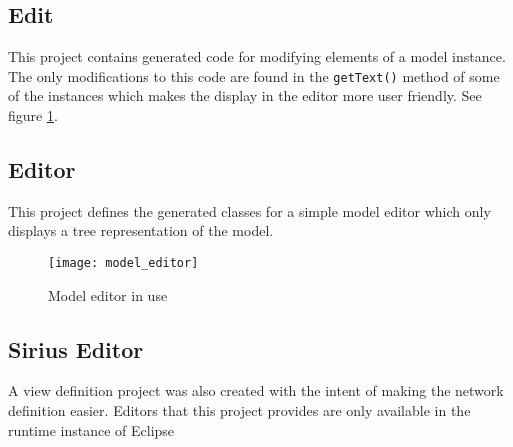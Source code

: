 \subsection{Edit}
This project contains generated code for modifying elements of a model instance. The only
modifications to this code are found in the \texttt{getText()} method of some of the instances
which makes the display in the editor more user friendly. See figure \ref{fig:model_editor}.
\subsection{Editor}
This project defines the generated classes for a simple model editor which
only displays a tree representation of the model.
\begin{figure}[h]
    \texttt{[image: model\_editor]}
    \caption{Model editor in use}
    \label{fig:model_editor}
\end{figure}
\subsection{Sirius Editor}
A view definition project was also created with the intent of making the network
definition easier. Editors that this project provides are only available in the 
runtime instance of Eclipse
